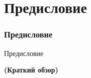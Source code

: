 %

\section{Предисловие}
\begin{frame}[fragile]
	\frametitle{Предисловие}

	\begin{center}\huge{Предисловие}\end{center}
	\begin{center}\huge{\color{typo3darkgrey}\textbf{(Краткий обзор)}}\end{center}

\end{frame}

